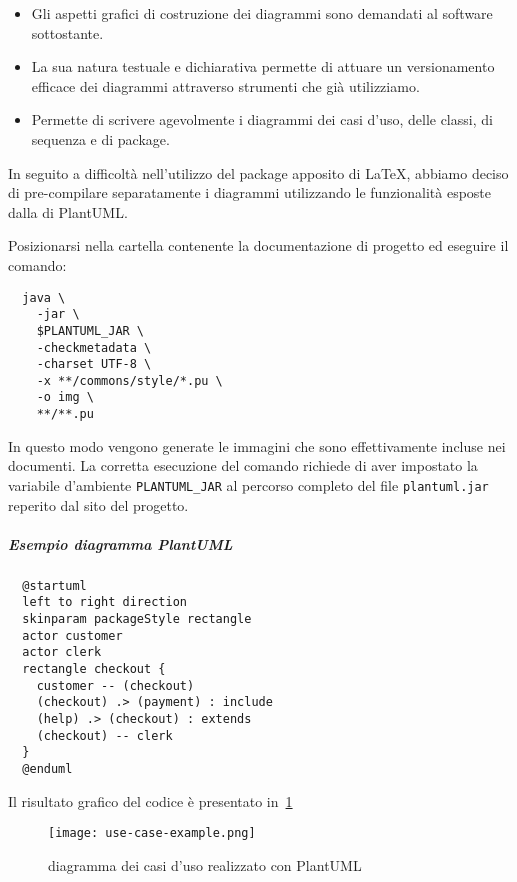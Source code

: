 \documentclass[../norme-di-progetto.tex]{subfiles}
\begin{document}
\begin{itemize}
  \item Gli aspetti grafici di costruzione dei diagrammi sono demandati al software sottostante.
  \item La sua natura testuale e dichiarativa permette di attuare un versionamento efficace dei diagrammi attraverso strumenti che già utilizziamo.
  \item Permette di scrivere agevolmente i diagrammi dei casi d'uso, delle classi, di sequenza e di package.
\end{itemize}

In seguito a difficoltà nell'utilizzo del package apposito di \LaTeX{}, abbiamo deciso di pre-compilare separatamente i diagrammi utilizzando le funzionalità esposte dalla  di PlantUML\@.

Posizionarsi nella cartella contenente la documentazione di progetto ed eseguire il comando:

\begin{verbatim}
  java \
    -jar \
    $PLANTUML_JAR \
    -checkmetadata \
    -charset UTF-8 \
    -x **/commons/style/*.pu \
    -o img \
    **/**.pu
\end{verbatim}

In questo modo vengono generate le immagini che sono effettivamente incluse nei documenti.
La corretta esecuzione del comando richiede di aver impostato la variabile d'ambiente \verb|PLANTUML_JAR| al percorso completo del file \verb|plantuml.jar| reperito dal sito del progetto.

\subparagraph{Esempio diagramma PlantUML}%
\label{subp:esempio_diagramma_plantuml}

\begin{verbatim}
  @startuml
  left to right direction
  skinparam packageStyle rectangle
  actor customer
  actor clerk
  rectangle checkout {
    customer -- (checkout)
    (checkout) .> (payment) : include
    (help) .> (checkout) : extends
    (checkout) -- clerk
  }
  @enduml
\end{verbatim}

Il risultato grafico del codice è presentato in~\ref{fig:esempio_caso_duso}

\begin{figure}[H]%
  \label{fig:esempio_caso_duso}
  \texttt{[image: use-case-example.png]}
  \centering
  \caption{diagramma dei casi d'uso realizzato con PlantUML}
\end{figure}
\end{document}
